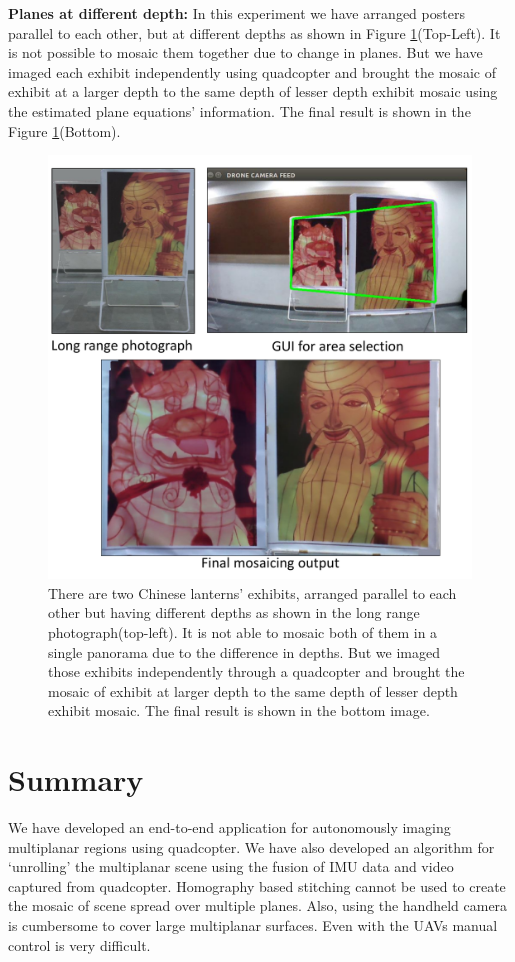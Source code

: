 \textbf{Planes at different depth:} In this experiment we have arranged posters
parallel to each other, but at different depths as shown in Figure
\ref{fig:resultFrontBack}(Top-Left). It is not possible to mosaic them together
due to change in planes. But we have imaged each exhibit independently using
quadcopter and brought the mosaic of exhibit at a larger depth to the same depth
of lesser depth exhibit mosaic using the estimated plane equations' information.
The final result is shown in the Figure \ref{fig:resultFrontBack}(Bottom).
\begin{figure}
\centering
\includegraphics[width=\linewidth]{figures/multiplanar/frontback.pdf}
\caption[Result: Imaging at different depths]{There are two Chinese lanterns'
exhibits, arranged parallel to each other but having different depths as shown in the long range
photograph(top-left). It is not able to mosaic both of them in a single
panorama due to the difference in depths. But we imaged those exhibits
independently through a quadcopter and brought the mosaic of exhibit at larger
depth to the same depth of lesser depth exhibit mosaic. The final result is
shown in the bottom image.}
\label{fig:resultFrontBack}
\end{figure}

\section{Summary}
We have developed an end-to-end application for autonomously imaging multiplanar
regions using quadcopter. We have also developed an algorithm for `unrolling'
the multiplanar scene using the fusion of IMU data and video captured from
quadcopter. Homography based stitching cannot be used to create the mosaic of
scene spread over multiple planes. Also, using the handheld camera is cumbersome
to cover large multiplanar surfaces. Even with the UAVs manual control is very difficult.

